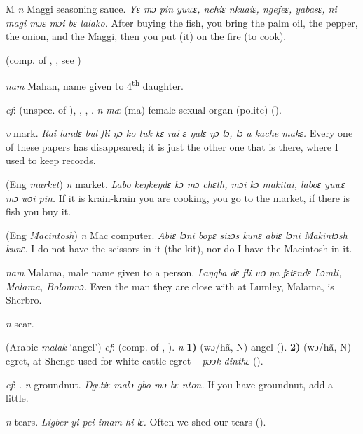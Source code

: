 \begin{letter}{M}
 \textit{n} Maggi seasoning sauce. \textit{Yɛ mɔ pin yuwɛ, nchiɛ nkuaiɛ, ngefeɛ, yabasɛ, ni magi mɔɛ mɔi bɛ lalako.} After buying the fish, you bring the palm oil, the pepper, the onion, and the Maggi, then you put (it) on the fire (to cook). 

 (comp. of , , see )

 \textit{nam} Mahan, name given to 4\textsuperscript{th} daughter.

 \textit{cf}:  (unspec. of ), , , . \textit{n} \textit{mæ} (ma) female sexual organ (polite) (\citealt{Pichl1967}). 

 \textit{v} mark. \textit{Rai landɛ bul fli ŋɔ ko tuk kɛ rai ɛ ŋalɛ ŋɔ lɔ, lɔ a kache makɛ.} Every one of these papers has disappeared; it is just the other one that is there, where I used to keep records. 

 (Eng \textit{market}) \textit{n} market. \textit{Labo keŋkeŋdɛ kɔ mɔ chɛth, mɔi kɔ makitai, laboɛ yuwɛ mɔ wɔi pin.} If it is krain-krain you are cooking, you go to the market, if there is fish you buy it.

 (Eng \textit{Macintosh}) \textit{n} Mac computer. \textit{Abiɛ lɔni bopɛ sizɔs kunɛ abiɛ lɔni Makintɔsh kunɛ.} I do not have the scissors in it (the kit), nor do I have the Macintosh in it.

 \textit{nam} Malama, male name given to a person. \textit{Laŋgba dɛ fli wɔ ŋa fɛtɛndɛ Lɔmli, Malama, Bolomnɔ.} Even the man they are close with at Lumley, Malama, is Sherbro.

 \textit{n} scar.

 (Arabic { }\textit{malak} ‘angel') \textit{cf}:  (comp. of , ). \textit{n} \textbf{1)} (wɔ/hã, N) angel (\citealt{Pichl1967}). \textbf{2)} (wɔ/hã, N) egret, at Shenge used for white cattle egret -- \textit{pɔɔk dinthɛ} (\citealt{Pichl1967}). 

 \textit{cf}: . \textit{n} groundnut. \textit{Ŋgɛtiɛ malɔ gbo mɔ bɛ nton.} If you have groundnut, add a little.

 \textit{n} tears. \textit{Ligber yi pei imam hi lɛ.} Often we shed our tears (\citealt{Pichl1967}). 


\end{letter}
